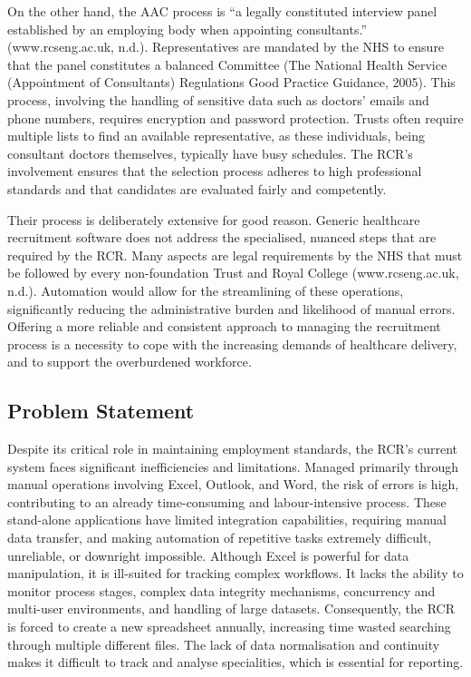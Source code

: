 On the other hand, the AAC process is “a legally constituted interview panel established by an employing body when appointing consultants.” (www.rcseng.ac.uk, n.d.). Representatives are mandated by the NHS to ensure that the panel constitutes a balanced Committee (The National Health Service (Appointment of Consultants) Regulations Good Practice Guidance, 2005). This process, involving the handling of sensitive data such as doctors' emails and phone numbers, requires encryption and password protection. Trusts often require multiple lists to find an available representative, as these individuals, being consultant doctors themselves, typically have busy schedules. The RCR’s involvement ensures that the selection process adheres to high professional standards and that candidates are evaluated fairly and competently.

Their process is deliberately extensive for good reason. Generic healthcare recruitment software does not address the specialised, nuanced steps that are required by the RCR. Many aspects are legal requirements by the NHS that must be followed by every non-foundation Trust and Royal College (www.rcseng.ac.uk, n.d.). Automation would allow for the streamlining of these operations, significantly reducing the administrative burden and likelihood of manual errors. Offering a more reliable and consistent approach to managing the recruitment process is a necessity to cope with the increasing demands of healthcare delivery, and to support the overburdened workforce.
\subsection{Problem Statement}
Despite its critical role in maintaining employment standards, the RCR's current system faces significant inefficiencies and limitations. Managed primarily through manual operations involving Excel, Outlook, and Word, the risk of errors is high, contributing to an already time-consuming and labour-intensive process. These stand-alone applications have limited integration capabilities, requiring manual data transfer, and making automation of repetitive tasks extremely difficult, unreliable, or downright impossible. Although Excel is powerful for data manipulation, it is ill-suited for tracking complex workflows. It lacks the ability to monitor process stages, complex data integrity mechanisms, concurrency and multi-user environments, and handling of large datasets. Consequently, the RCR is forced to create a new spreadsheet annually, increasing time wasted searching through multiple different files. The lack of data normalisation and continuity makes it difficult to track and analyse specialities, which is essential for reporting.

